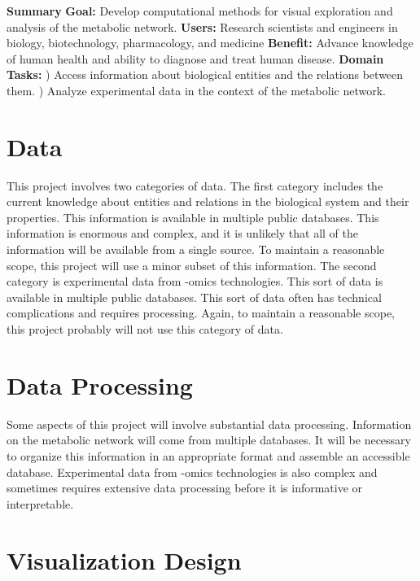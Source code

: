 \noindent
\textbf{Summary}
\newline
\noindent
\textbf{Goal:} Develop computational methods for visual exploration and analysis of the metabolic network.
\newline
\noindent
\textbf{Users:} Research scientists and engineers in biology, biotechnology, pharmacology, and medicine
\newline
\noindent
\textbf{Benefit:} Advance knowledge of human health and ability to diagnose and treat human disease.
\newline
\noindent
\textbf{Domain Tasks:}
\newline
{}) Access information about biological entities and the relations between them.
\newline
{}) Analyze experimental data in the context of the metabolic network.

\section{Data}

This project involves two categories of data.
The first category includes the current knowledge about entities and relations in the biological system and their properties.
This information is available in multiple public databases.
This information is enormous and complex, and it is unlikely that all of the information will be available from a single source.
To maintain a reasonable scope, this project will use a minor subset of this information.
The second category is experimental data from -omics technologies.
This sort of data is available in multiple public databases.
This sort of data often has technical complications and requires processing.
Again, to maintain a reasonable scope, this project probably will not use this category of data.

\section{Data Processing}

Some aspects of this project will involve substantial data processing.
Information on the metabolic network will come from multiple databases.
It will be necessary to organize this information in an appropriate format and assemble an accessible database.
Experimental data from -omics technologies is also complex and sometimes requires extensive data processing before it is informative or interpretable.

\section{Visualization Design}

